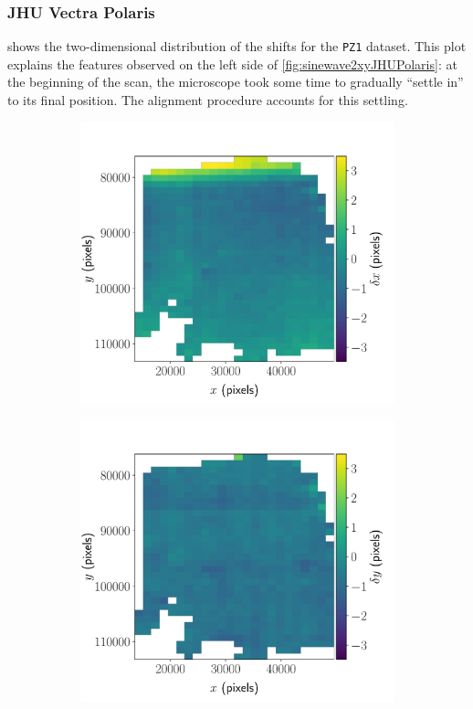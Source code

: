\documentclass{article}
\begin{document}
\subsubsection{JHU Vectra Polaris}
\label{sec:2Dpolaris}

 shows the two-dimensional distribution of the shifts for the \texttt{PZ1} dataset.  This plot explains the features observed on the left side of \cref{fig:sinewave2xyJHUPolaris}: at the beginning of the scan, the microscope took some time to gradually ``settle in'' to its final position.  The alignment procedure accounts for this settling.

\begin{figure}[ht]
	\centering
	\begin{subfigure}{0.49\linewidth}
		\includegraphics[width=\linewidth]{2D-shifts-JHUPolaris-x}
		\caption{}
		\label{fig:2Dpolarisx}
	\end{subfigure}
	\begin{subfigure}{0.49\linewidth}
		\includegraphics[width=\linewidth]{2D-shifts-JHUPolaris-y}

\end{subfigure}
\end{figure}
\end{document}
